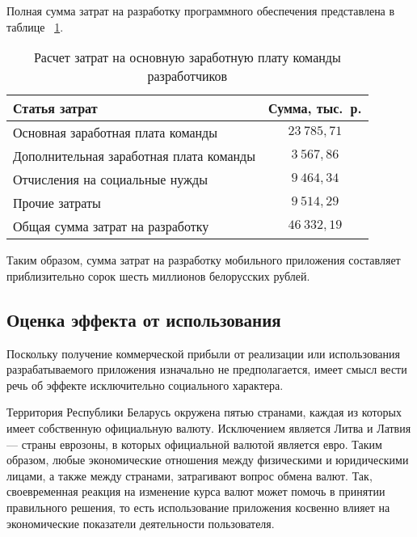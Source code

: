 Полная сумма затрат на разработку программного обеспечения представлена в таблице
~\ref{tbl:teo_sum_cost}.

\begin{table} [h!]
  \caption{
    Расчет затрат на основную заработную плату команды разработчиков
  }\label{tbl:teo_sum_cost}
  \begin{tabular}{| m{13.5cm} | c |}
    \hline

    \parbox{13.5cm}{
    \smallskip
    \centering Статья затрат
    \smallskip
    }
    &
      \parbox{2cm}{
      \smallskip
      \centering Сумма, тыс.~р.
    \smallskip
    } \\
    \hline

    Основная заработная плата команды
    & \( 23 \: 785{,}71 \)\\
    \hline

    Дополнительная заработная плата команды
    & \( 3 \: 567{,}86 \)\\
    \hline

    Отчисления на социальные нужды
    & \( 9 \: 464{,}34 \)\\
    \hline

    Прочие затраты
    & \( 9 \: 514{,}29 \)\\
    \hline

    Общая сумма затрат на разработку
    & \( 46 \: 332{,}19 \) \\
    \hline
  \end{tabular}
\end{table}

Таким образом, сумма затрат на разработку мобильного приложения
составляет приблизительно сорок шесть миллионов белорусских рублей.

\subsection{Оценка эффекта от использования}

Поскольку получение коммерческой прибыли от реализации или использования
разрабатываемого приложения изначально не предполагается,
имеет смысл вести речь об эффекте исключительно социального характера.

Территория Республики Беларусь окружена пятью странами, каждая из которых
имеет собственную официальную валюту. Исключением является Литва и Латвия ---
страны еврозоны, в которых официальной валютой является евро. Таким
образом, любые экономические отношения между физическими и юридическими лицами,
а также между странами, затрагивают вопрос обмена валют.
Так, своевременная реакция на изменение курса валют может помочь
в принятии правильного решения, то есть использование приложения
косвенно влияет на экономические показатели деятельности пользователя.
